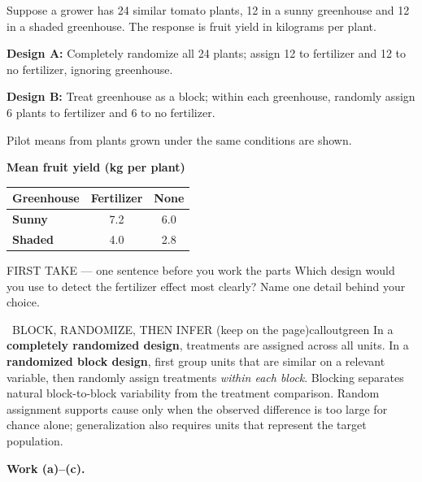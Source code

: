 \documentclass[11pt]{article}
\begin{document}


Suppose a grower has 24 similar tomato plants, 12 in a sunny greenhouse and 12 in a shaded greenhouse. The response is fruit yield in kilograms per plant.\par\smallskip \textbf{Design A:} Completely randomize all 24 plants; assign 12 to fertilizer and 12 to no fertilizer, ignoring greenhouse.\par \textbf{Design B:} Treat greenhouse as a block; within each greenhouse, randomly assign 6 plants to fertilizer and 6 to no fertilizer.\par\smallskip Pilot means from plants grown under the same conditions are shown.\par
\begin{center}
\textbf{Mean fruit yield (kg per plant)}\par\smallskip
\begin{tabular}{|l|c|c|}
\hline
\textbf{Greenhouse} & \textbf{Fertilizer} & \textbf{None} \\ \hline
\textbf{Sunny} & 7.2 & 6.0 \\ \hline
\textbf{Shaded} & 4.0 & 2.8 \\ \hline
\end{tabular}
\end{center}
\begin{firsttakebox}{FIRST TAKE --- one sentence before you work the parts}
Which design would you use to detect the fertilizer effect most clearly? Name one detail behind your choice.
\workspace{0.9in}
\end{firsttakebox}

\begin{callout}{\IconBook\ BLOCK, RANDOMIZE, THEN INFER (keep on the page)}{calloutgreen}
In a \textbf{completely randomized design}, treatments are assigned across all units. In a
\textbf{randomized block design}, first group units that are similar on a relevant variable, then randomly
assign treatments \emph{within each block}. Blocking separates natural block-to-block variability from the
treatment comparison. Random assignment supports cause only when the observed difference is too large for
chance alone; generalization also requires units that represent the target population.
\end{callout}

\newpage
\textbf{Work (a)--(c).}\par\smallskip
\end{document}
